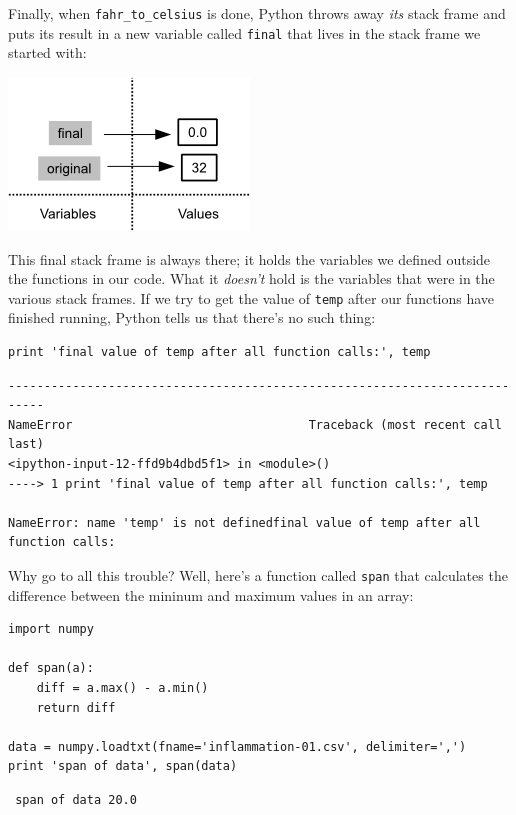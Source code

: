 \documentclass{book}
\begin{document}
Finally, when \texttt{fahr\_to\_celsius} is done, Python throws away
\emph{its} stack frame and puts its result in a new variable called
\texttt{final} that lives in the stack frame we started with:

\includegraphics{novice/python/img/python-call-stack-07.png}

This final stack frame is always there; it holds the variables we
defined outside the functions in our code. What it \emph{doesn't} hold
is the variables that were in the various stack frames. If we try to get
the value of \texttt{temp} after our functions have finished running,
Python tells us that there's no such thing:

\begin{verbatim}
print 'final value of temp after all function calls:', temp
\end{verbatim}

\begin{verbatim}
---------------------------------------------------------------------------
NameError                                 Traceback (most recent call last)
<ipython-input-12-ffd9b4dbd5f1> in <module>()
----> 1 print 'final value of temp after all function calls:', temp

NameError: name 'temp' is not definedfinal value of temp after all function calls:
\end{verbatim}

Why go to all this trouble? Well, here's a function called \texttt{span}
that calculates the difference between the mininum and maximum values in
an array:

\begin{verbatim}
import numpy

def span(a):
    diff = a.max() - a.min()
    return diff

data = numpy.loadtxt(fname='inflammation-01.csv', delimiter=',')
print 'span of data', span(data)
\end{verbatim}

\begin{verbatim}
 span of data 20.0
\end{verbatim}
\end{document}
